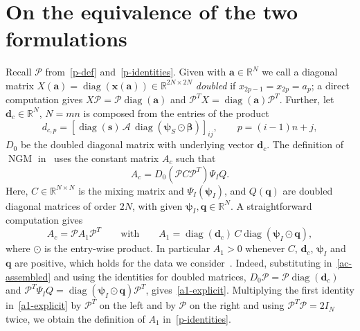 \documentclass[11pt]{article}
\theoremstyle{plain}
\theoremstyle{definition}
\theoremstyle{remark}
\numberwithin{equation}{section}
\numberwithin{figure}{section}
\numberwithin{table}{section}
\numberwithin{algorithm}{section}
\begin{document}
\FloatBarrier
\appendix

\section{On the equivalence of the two formulations}\label{sec-reduction}

Recall $\mathscr{P}$ from~\eqref{p-def} and~\eqref{p-identities}. 
Given with $\bm{a}\in \mathbb{R}^{N}$ we call a diagonal matrix
$X(\bm a)=\operatorname{diag}\left(\bm x(\bm a)\right)
\in\mathbb{R}^{2N\times 2N}$ 
\emph{doubled} if $x_{2p-1}=x_{2p}=a_p$; 
a direct computation gives $X\mathscr{P}=\mathscr{P}\operatorname{diag}(\bm a)$ and
$\mathscr{P}^TX=\operatorname{diag}(\bm a)\mathscr{P}^T$. Further, let $\bm d_c\in\mathbb{R}^{N}$, $N=mn$ is composed from the entries of the product 
\begin{equation}
d_{c,p}=\left\lbrack\operatorname{diag}(\bm s)\,\mathscr{A}\,
\operatorname{diag}\left(\bm\psi_S\odot\bm\beta\right)\right\rbrack_{ij},
\qquad p=(i-1)n+j,
\end{equation} 
$D_0$ be the doubled diagonal matrix with underlying vector $\bm d_c$. 
The definition of $\operatorname{NGM}$ in~\cite{JZh} uses the constant matrix $A_c$ such that 
\begin{equation}\label{ac-assembled}
A_c=D_0\left(\mathscr{P}C\mathscr{P}^T\right)\Psi_IQ.
\end{equation}
Here, $C\in\mathbb{R}^{N\times N}$ is the mixing matrix and $\Psi_I(\bm\psi_I)$, and $Q(\bm q)$ 
are doubled diagonal matrices of order $2N$, with given
$\bm\psi_I,\bm q\in\mathbb{R}^{N}$.
A straightforward computation gives
\begin{equation}\label{a1-explicit}
A_c=\mathscr{P}A_1\mathscr{P}^T\qquad\mbox{with}\qquad
A_1=\operatorname{diag}(\bm d_c)\,C\operatorname{diag}\left(\bm\psi_I\odot\bm q\right),
\end{equation}
where $\odot$ is the entry-wise product. In particular $A_1>0$ whenever $C$,
$\bm d_c$, $\bm\psi_I$ and $\bm q$ are positive, which holds for the data we consider~\cite{JZh}. Indeed,
substituting in~\eqref{ac-assembled} and using the identities for doubled
matrices, $D_0\mathscr{P}=\mathscr{P}\operatorname{diag}(\bm d_c)$ and
$\mathscr{P}^T\Psi_IQ=\operatorname{diag}\left(\bm\psi_I\odot\bm q\right)\mathscr{P}^T$,
gives~\eqref{a1-explicit}. Multiplying the first identity
in~\eqref{a1-explicit} by $\mathscr{P}^T$ on the left and by $\mathscr{P}$ on the
right and using $\mathscr{P}^T\mathscr{P}=2I_N$ twice, we obtain the definition
of $A_1$ in~\eqref{p-identities}.
\end{document}
